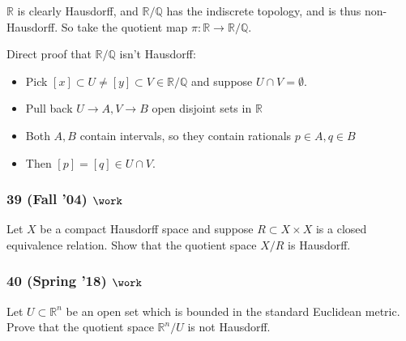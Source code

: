 \begin{solution}

\envlist

\begin{concept}

\envlist

\end{concept}

\({\mathbb{R}}\) is clearly Hausdorff, and \({\mathbb{R}}/{\mathbb{Q}}\)
has the indiscrete topology, and is thus non-Hausdorff. So take the
quotient map \(\pi:{\mathbb{R}}\to {\mathbb{R}}/{\mathbb{Q}}\).

Direct proof that \({\mathbb{R}}/{\mathbb{Q}}\) isn't Hausdorff:

\begin{itemize}
\tightlist
\item
  Pick
  \([x] \subset U \neq [y] \subset V \in {\mathbb{R}}/{\mathbb{Q}}\) and
  suppose \(U\cap V = \emptyset\).
\item
  Pull back \(U\to A, V\to B\) open disjoint sets in \({\mathbb{R}}\)
\item
  Both \(A, B\) contain intervals, so they contain rationals
  \(p\in A, q\in B\)
\item
  Then \([p] = [q] \in U\cap V\).
\end{itemize}

\end{solution}

\hypertarget{fall-04-work-1}{%
\subsubsection{\texorpdfstring{39 (Fall '04)
\(\work\)}{39 (Fall '04) \textbackslash work}}\label{fall-04-work-1}}

\begin{problem}[?]

Let \(X\) be a compact Hausdorff space and suppose
\(R \subset X \times X\) is a closed equivalence relation. Show that the
quotient space \(X/R\) is Hausdorff.

\end{problem}

\hypertarget{spring-18-work}{%
\subsubsection{\texorpdfstring{40 (Spring '18)
\(\work\)}{40 (Spring '18) \textbackslash work}}\label{spring-18-work}}

\begin{problem}[?]

Let \(U \subset {\mathbb{R}}^n\) be an open set which is bounded in the
standard Euclidean metric. Prove that the quotient space
\({\mathbb{R}}^n / U\) is not Hausdorff.

\end{problem}

